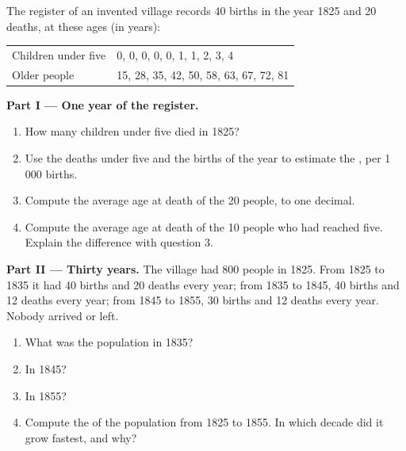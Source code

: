 \begin{problem}
\label{pb:g6:health-and-population:1}
The register of an invented village records 40 births in the year 1825 and 20
deaths, at these ages (in years):

\begin{center}
\begin{tabular}{ll}
\toprule
Children under five & 0, 0, 0, 0, 0, 1, 1, 2, 3, 4 \\
Older people        & 15, 28, 35, 42, 50, 58, 63, 67, 72, 81 \\
\bottomrule
\end{tabular}
\end{center}

\medskip
\noindent\textbf{Part I --- One year of the register.}
\begin{enumerate}
  \item How many children under five died in 1825?
  \item Use the deaths under five and the births of the year to estimate the
        , per 1\,000 births.
  \item Compute the average age at death of the 20 people, to one decimal.
  \item Compute the average age at death of the 10 people who had reached five.
        Explain the difference with question 3.
\end{enumerate}

\medskip
\noindent\textbf{Part II --- Thirty years.} The village had 800 people in 1825.
From 1825 to 1835 it had 40 births and 20 deaths every year; from 1835 to 1845,
40 births and 12 deaths every year; from 1845 to 1855, 30 births and 12 deaths
every year. Nobody arrived or left.
\begin{enumerate}[resume]
  \item What was the population in 1835?
  \item In 1845?
  \item In 1855?
  \item Compute the  of the population from 1825 to 1855. In which
        decade did it grow fastest, and why?
\end{enumerate}


\end{problem}
